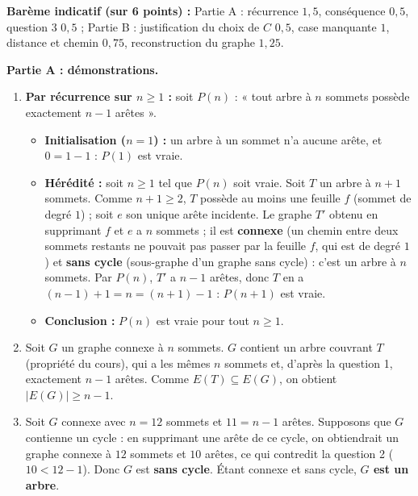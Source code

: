 \documentclass[11pt]{article}
\newcommand{\cle}[1]{{\popxbold\color{popdark}#1}}
\begin{document}
\begin{corrige}
\textbf{Barème indicatif (sur 6 points) :} Partie A : récurrence $1,5$, conséquence $0,5$, question 3 $0,5$ ; Partie B : justification du choix de $C$ $0,5$, case manquante $1$, distance et chemin $0,75$, reconstruction du graphe $1,25$.

\textbf{Partie A : démonstrations.}
\begin{enumerate}
\item \textbf{Par récurrence sur $n \geq 1$ :} soit $P(n)$ : « tout arbre à $n$ sommets possède exactement $n-1$ arêtes ».
\begin{itemize}
    \item \textbf{Initialisation ($n = 1$) :} un arbre à un sommet n'a aucune arête, et $0 = 1 - 1$ : $P(1)$ est vraie.
    \item \textbf{Hérédité :} soit $n \geq 1$ tel que $P(n)$ soit vraie. Soit $T$ un arbre à $n+1$ sommets. Comme $n + 1 \geq 2$, $T$ possède au moins une \cle{feuille} $f$ (sommet de degré $1$) ; soit $e$ son unique arête incidente. Le graphe $T'$ obtenu en supprimant $f$ et $e$ a $n$ sommets ; il est \textbf{connexe} (un chemin entre deux sommets restants ne pouvait pas passer par la feuille $f$, qui est de degré $1$) et \textbf{sans cycle} (sous-graphe d'un graphe sans cycle) : c'est un arbre à $n$ sommets. Par $P(n)$, $T'$ a $n-1$ arêtes, donc $T$ en a $(n-1) + 1 = n = (n+1) - 1$ : $P(n+1)$ est vraie.
    \item \textbf{Conclusion :} $P(n)$ est vraie pour tout $n \geq 1$.
\end{itemize}
\item Soit $G$ un graphe connexe à $n$ sommets. $G$ contient un arbre couvrant $T$ (propriété du cours), qui a les mêmes $n$ sommets et, d'après la question 1, exactement $n-1$ arêtes. Comme $E(T) \subseteq E(G)$, on obtient $|E(G)| \geq n - 1$.
\item Soit $G$ connexe avec $n = 12$ sommets et $11 = n - 1$ arêtes. Supposons que $G$ contienne un cycle : en supprimant une arête de ce cycle, on obtiendrait un graphe connexe à $12$ sommets et $10$ arêtes, ce qui contredit la question 2 ($10 < 12 - 1$). Donc $G$ est \textbf{sans cycle}. Étant connexe et sans cycle, \textbf{$G$ est un arbre}.
\end{enumerate}


\end{corrige}
\end{document}
